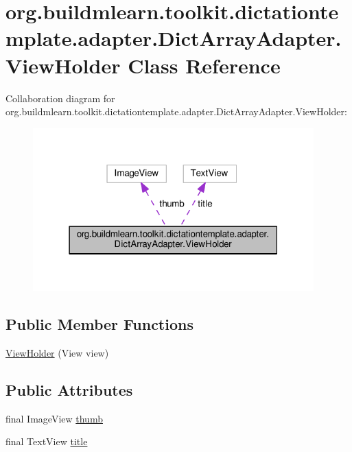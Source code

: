 \hypertarget{classorg_1_1buildmlearn_1_1toolkit_1_1dictationtemplate_1_1adapter_1_1DictArrayAdapter_1_1ViewHolder}{}\section{org.\+buildmlearn.\+toolkit.\+dictationtemplate.\+adapter.\+Dict\+Array\+Adapter.\+View\+Holder Class Reference}
\label{classorg_1_1buildmlearn_1_1toolkit_1_1dictationtemplate_1_1adapter_1_1DictArrayAdapter_1_1ViewHolder}


Collaboration diagram for org.\+buildmlearn.\+toolkit.\+dictationtemplate.\+adapter.\+Dict\+Array\+Adapter.\+View\+Holder\+:
\nopagebreak
\begin{figure}[H]
\begin{center}
\leavevmode
\includegraphics[width=307pt]{classorg_1_1buildmlearn_1_1toolkit_1_1dictationtemplate_1_1adapter_1_1DictArrayAdapter_1_1ViewHolder__coll__graph}
\end{center}
\end{figure}
\subsection*{Public Member Functions}
\begin{DoxyCompactItemize}
\item 
\hyperlink{classorg_1_1buildmlearn_1_1toolkit_1_1dictationtemplate_1_1adapter_1_1DictArrayAdapter_1_1ViewHolder_ab927225ee59da26f1d913d398ba05650}{View\+Holder} (View view)
\end{DoxyCompactItemize}
\subsection*{Public Attributes}
\begin{DoxyCompactItemize}
\item 
final Image\+View \hyperlink{classorg_1_1buildmlearn_1_1toolkit_1_1dictationtemplate_1_1adapter_1_1DictArrayAdapter_1_1ViewHolder_a222738a3f0601644b987093f14cd5521}{thumb}
\item 
final Text\+View \hyperlink{classorg_1_1buildmlearn_1_1toolkit_1_1dictationtemplate_1_1adapter_1_1DictArrayAdapter_1_1ViewHolder_aba9443853c3b80d7bc8adad009b433d5}{title}
\end{DoxyCompactItemize}


